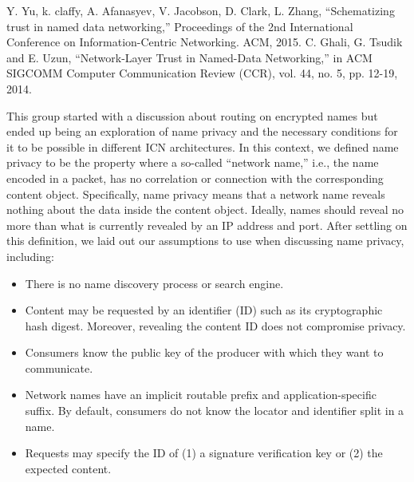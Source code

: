 \documentclass[a4paper,UKenglish]{dagrep}
\begin{document}
\begin{thebibliography}{[0]}
\bibitem{[1]} Y. Yu, k. claffy, A. Afanasyev, V. Jacobson, D. Clark, L. Zhang, ``Schematizing trust in named data networking,'' Proceedings of the 2nd International Conference on Information-Centric Networking. ACM, 2015.
\bibitem{[2]} C. Ghali, G. Tsudik and E. Uzun, ``Network-Layer Trust in Named-Data Networking,'' in ACM SIGCOMM Computer Communication Review (CCR), vol. 44, no. 5, pp. 12-19, 2014.
\end{thebibliography}

\license

This group started with a discussion about routing on encrypted names but ended up being an exploration of name privacy and the necessary conditions for it to be possible in different ICN architectures. In this context, we defined name privacy to be the property where a so-called ``network name,'' i.e., the name encoded in a packet, has no correlation or connection with the corresponding content object. Specifically, name privacy means that a network name reveals nothing about the data inside the content object. Ideally, names should reveal no more than what is currently revealed by an IP address and port. After settling on this definition, we laid out our assumptions to use when discussing name privacy, including:

\begin{itemize}
\item There is no name discovery process or search engine.
\item Content may be requested by an identifier (ID) such as its cryptographic hash digest. Moreover, revealing the content ID does not compromise privacy.
\item Consumers know the public key of the producer with which they want to communicate.
\item Network names have an implicit routable prefix and application-specific suffix. By default, consumers do not know the locator and identifier split in a name.
\item Requests may specify the ID of (1) a signature verification key or (2) the expected content.
\end{itemize}
\end{document}
